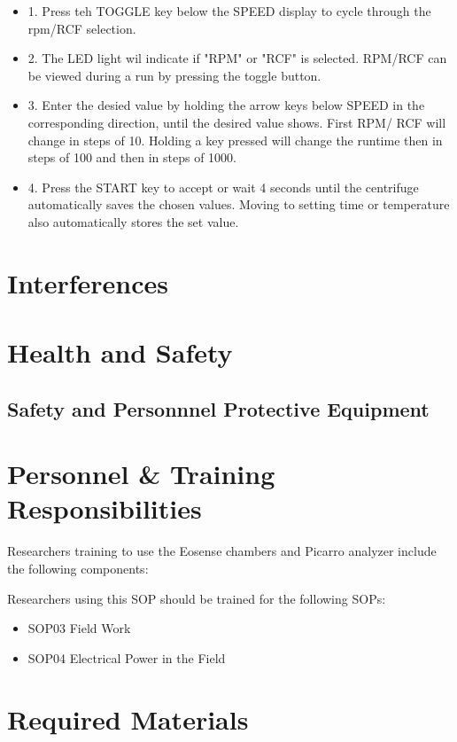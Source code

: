 \documentclass[12pt]{../SOP3_beta}
\begin{document}
\begin{itemize}
  \item 1. Press teh TOGGLE key below the SPEED display to cycle through the rpm/RCF selection.
  \item 2. The LED light wil indicate if "RPM" or "RCF" is selected. RPM/RCF can be viewed during a run by pressing the toggle button. 
  \item 3. Enter the desied value by holding the arrow keys below SPEED in the corresponding direction, until the desired value shows. First RPM/ RCF will change in steps of 10. Holding a key pressed will change the runtime then in steps of 100 and then in steps of 1000. 
  \item 4. Press the START key to accept or wait 4 seconds until the centrifuge automatically saves the chosen values. Moving to setting time or temperature also automatically stores the set value. 
\end{itemize}
\section{Interferences}

\section{Health and Safety}

\NP \lipsum[2]

\subsection{Safety and Personnnel Protective Equipment}


\section{Personnel \& Training Responsibilities}

Researchers training to use the Eosense chambers and Picarro analyzer include the following components: 



Researchers using this SOP should be trained for the following SOPs:

\begin{itemize}
  \item SOP03 Field Work
  \item SOP04 Electrical Power in the Field
\end{itemize}

\section{Required Materials}
\end{document}

